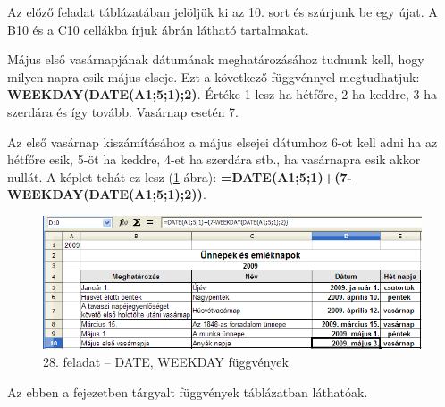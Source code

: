 Az előző feladat táblázatában jelöljük ki az 10. sort
és szúrjunk be egy újat. A B10 és a C10 cellákba írjuk
 ábrán látható tartalmakat.

Május első vasárnapjának dátumának meghatározásához
tudnunk kell, hogy milyen napra esik május elseje. Ezt a
következő függvénnyel megtudhatjuk:
{\sffamily\textbf{WEEKDAY(DATE(A1;5;1);2)}}.
Értéke 1 lesz ha hétfőre, 2 ha keddre, 3 ha szerdára és
így tovább. Vasárnap esetén 7.

Az első vasárnap kiszámításához a május elsejei
dátumhoz 6-ot kell adni ha az hétfőre esik, 5-öt ha keddre,
4-et ha szerdára stb., ha vasárnapra esik akkor nullát. A
képlet tehát ez lesz (\ref{28-feladatDATE} ábra):
{\sffamily\textbf{=DATE(A1;5;1)+(7-WEEKDAY(DATE(A1;5;1);2))}}.

\begin{figure}[!h]
\begin{center}
\includegraphics[width=15.999cm]{oocalcv1-img124.png}
\caption{28. feladat -- DATE, WEEKDAY függvények}\label{28-feladatDATE}
\end{center}
\end{figure}

Az ebben a fejezetben tárgyalt függvények 
táblázatban láthatóak.


